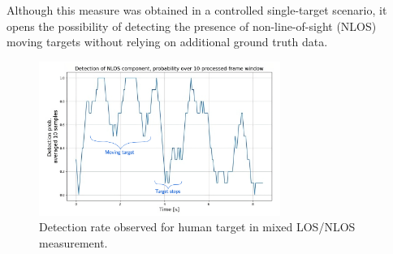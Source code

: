 Although this measure was obtained in a controlled single-target scenario, it opens the possibility of detecting the presence of non-line-of-sight (NLOS) moving targets without relying on additional ground truth data.


\begin{figure}[H]
	\centering
	\includegraphics[width=0.7\textwidth]{Images/Test1/moving_avg-transformed_wtext}
	\caption{Detection rate observed for human target in mixed LOS/NLOS measurement.}
	\label{fig:Test1_moving_avg}
\end{figure}


